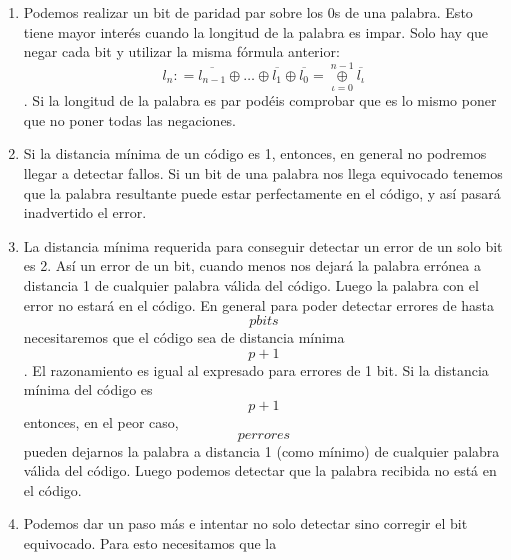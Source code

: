 \begin{enumerate}
\begin{enumerate}
\begin{enumerate}
\begin{enumerate}
        fórmula funciona es sencilla, si recordamos que
        \[a \oplus {a = 0}\] y que \[a \oplus {0 = a}\]. Así, para un
        código de un solo bit, el de paridad sería simple\-mente la
        repetición del bit (el bit de paridad par sería simplemente del
        mismo va\-lor que el ya existente). De esta forma lo dos bits
        son iguales y el número de 1s será o 0 o 2, esto es, siempre
        par. Si fuese el código original de 2 bits de longitud, el bit
        de paridad debería de valer 1 si solo uno de los dos (no los
        dos) valiese 1. Esto vuelve a ser la suma exclusiva. Y así
        sucesivamente.
      \item
        Podemos realizar un bit de paridad par sobre los 0s de una
        palabra. Esto tiene mayor interés cuando la longitud de la
        palabra es impar. Solo hay que negar cada bit y utilizar la
        misma fórmula anterior:
        \[l_{n}{: = \overline{l_{n-1}}} \oplus \ldots \oplus \overline{l_{1}} \oplus {\overline{l_{0}} = \underset{\iota = 0}{\overset{n - 1}{\oplus}}}\overline{l_{\iota}}\].
        Si la lon\-gitud de la palabra es par podéis comprobar que es lo
        mismo poner que no poner todas las negaciones.
      \item
        Si la distancia mínima de un código es 1, entonces, en general
        no podremos lle\-gar a detectar fallos. Si un bit de una palabra
        nos llega equivocado tenemos que la palabra resultante puede
        estar perfectamente en el código, y así pasará inadvertido el
        error.
      \item
        La distancia mínima requerida para conseguir detectar un error
        de un solo bit es 2. Así un error de un bit, cuando menos nos
        dejará la palabra errónea a distancia 1 de cualquier palabra
        válida del código. Luego la palabra con el error no estará en el
        código. En general para poder detectar errores de hasta
        \[p\mathit{bits}\]necesitaremos que el código sea de distancia
        mínima \[p + 1\]. El razonamiento es igual al expre\-sado para
        errores de 1 bit. Si la distancia mínima del código es
        \[p + 1\]entonces, en el peor caso, \[p\mathit{errores}\]pueden
        dejarnos la palabra a distancia 1 (como míni\-mo) de cualquier
        palabra válida del código. Luego podemos detectar que la
        pala\-bra recibida no está en el código.
      \item
        Podemos dar un paso más e intentar no solo detectar sino
        corregir el bit equivo\-cado. Para esto necesitamos que la

\end{enumerate}
\end{enumerate}
\end{enumerate}
\end{enumerate}
